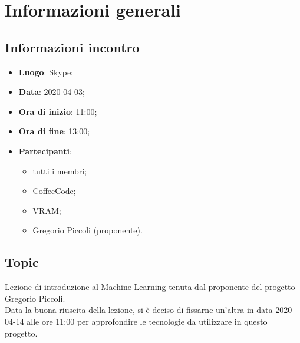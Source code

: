 \section{Informazioni generali}
\subsection{Informazioni incontro}
\begin{itemize}
\item \textbf{Luogo}: Skype;
\item \textbf{Data}: 2020-04-03;
\item \textbf{Ora di inizio}: 11:00;
\item \textbf{Ora di fine}: 13:00;
\item \textbf{Partecipanti}:
	\begin{itemize}
		\item tutti i membri;
		\item CoffeeCode;
		\item VRAM;
		\item Gregorio Piccoli (proponente).
	\end{itemize}
\end{itemize}

\subsection{Topic}
Lezione di introduzione al Machine Learning tenuta dal proponente del progetto Gregorio Piccoli. \\
Data la buona riuscita della lezione, si è deciso di fissarne un'altra in data 2020-04-14 alle ore 11:00 per approfondire le tecnologie da utilizzare in questo progetto.